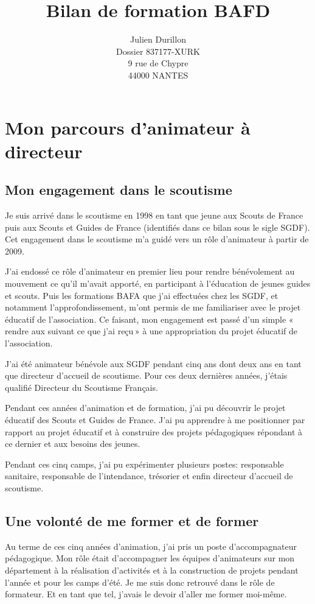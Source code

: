 \documentclass[titlepage,11pt,a4paper]{article}
\title{Bilan de formation BAFD}
\author{Julien Durillon\\Dossier 837177-XURK\\9 rue de Chypre\\44000 NANTES}
\begin{document}
\maketitle


\section{Mon parcours d'animateur à directeur}

\subsection{Mon engagement dans le scoutisme}

Je suis arrivé dans le scoutisme en 1998 en tant que jeune aux Scouts de France puis aux Scouts et Guides
de France (identifiés dans ce bilan sous le sigle SGDF). Cet engagement dans le scoutisme
m'a guidé vers un rôle d'animateur à partir de 2009.

J'ai endossé ce rôle d'animateur en premier lieu pour rendre bénévolement au mouvement ce
qu'il m'avait apporté, en participant à l'éducation de jeunes guides et scouts. Puis les
formations BAFA que j'ai effectuées chez les SGDF, et notamment l'approfondissement, m'ont
permis de me familiariser avec le projet éducatif de l'association. Ce faisant, mon
engagement est passé d'un simple «\,rendre aux suivant ce que j'ai reçu\,» à une
appropriation du projet éducatif de l'association.

J'ai été animateur bénévole aux SGDF pendant cinq ans dont deux ans en tant que directeur
d'accueil de scoutisme. Pour ces deux dernières années, j'étais qualifié Directeur du Scoutisme Français.

Pendant ces années d'animation et de formation, j'ai pu découvrir le projet éducatif des
Scouts et Guides de France. J'ai pu apprendre à me positionner par rapport au projet
éducatif et à construire des projets pédagogiques répondant à ce dernier et aux besoins
des jeunes.

Pendant ces cinq camps, j'ai pu expérimenter plusieurs postes: responsable sanitaire,
responsable de l'intendance, trésorier et enfin directeur d'accueil de scoutisme.

\subsection{Une volonté de me former et de former}

Au terme de ces cinq années d'animation, j'ai pris un poste d’accompagnateur pédagogique.
Mon rôle était d'accompagner les équipes d'animateurs sur mon département à la réalisation
d'activités et à la construction de projets pendant l'année et pour les camps d'été.
Je me suis donc retrouvé dans le rôle de formateur. Et en tant que tel, j'avais le
devoir d'aller me former moi-même.
\end{document}
